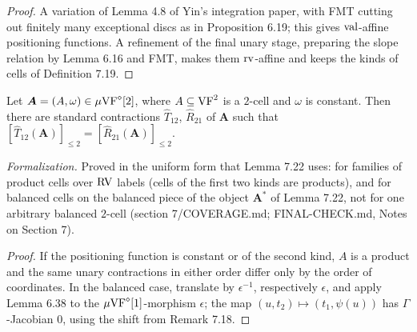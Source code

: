 \begin{proof}
\leanok
A variation of Lemma 4.8 of Yin's integration paper, with FMT cutting out finitely many exceptional discs as in Proposition 6.19; this gives $\operatorname{val}$-affine positioning functions. A refinement of the final unary stage, preparing the slope relation by Lemma 6.16 and FMT, makes them $\operatorname{rv}$-affine and keeps the kinds of cells of Definition 7.19.
\end{proof}

\setcounter{theorem}{20}
\begin{lemma}
\label{2-unit-contracted}
\leanok
{}
Let $\boldsymbol{A} = (A, \omega) \in \mu\mathrm{VF}^\diamond[2]$, where $A \subseteq \mathrm{VF}^2$ is a $2$-cell and $\omega$ is constant. Then there are standard contractions $\hat T_{12}$, $\hat R_{21}$ of $\boldsymbol{A}$ such that $[\hat T_{12}(\boldsymbol{A})]_{\leq 2} = [\hat R_{21}(\boldsymbol{A})]_{\leq 2}$.

\emph{Formalization.} Proved in the uniform form that Lemma 7.22 uses: for families of product cells over $\mathrm{RV}$ labels (cells of the first two kinds are products), and for balanced cells on the balanced piece of the object $\boldsymbol{A}^*$ of Lemma 7.22, not for one arbitrary balanced $2$-cell (section 7/COVERAGE.md; FINAL-CHECK.md, Notes on Section 7).
\end{lemma}

\begin{proof}
If the positioning function is constant or of the second kind, $A$ is a product and the same unary contractions in either order differ only by the order of coordinates. In the balanced case, translate by $\epsilon^{-1}$, respectively $\epsilon$, and apply Lemma 6.38 to the $\mu\mathrm{VF}^\diamond[1]$-morphism $\epsilon$; the map $(u, t_2) \mapsto (t_1, \psi(u))$ has $\Gamma$-Jacobian $0$, using the shift from Remark 7.18.
\end{proof}

